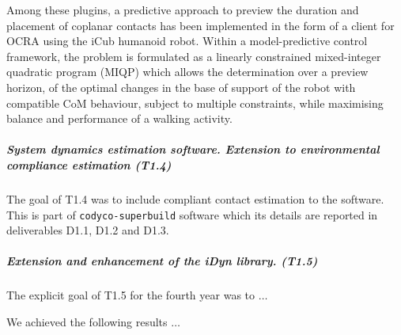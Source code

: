 Among these plugins, a predictive approach \cite{ibanez2015Emergence} to
preview the duration and placement of coplanar contacts has been implemented
in the form of a client for OCRA using the iCub humanoid robot.  Within a
model-predictive control framework, the problem is formulated as a linearly
constrained mixed-integer quadratic program (MIQP) which allows the
determination over a preview horizon, of the optimal changes in the base of
support of the robot with compatible CoM behaviour, subject to multiple
constraints, while maximising balance and performance of a walking activity.



\subparagraph{System dynamics estimation software. Extension to
environmental compliance estimation (T1.4)}

The goal of T1.4 was to include compliant contact estimation to the software.
This is part of \texttt{codyco-superbuild} software which its details are
reported in deliverables D1.1, D1.2 and D1.3.


\subparagraph{Extension and enhancement of the iDyn library. (T1.5)}

The explicit goal of T1.5 for the fourth year was to $\dots$

We achieved the following results $\dots$
